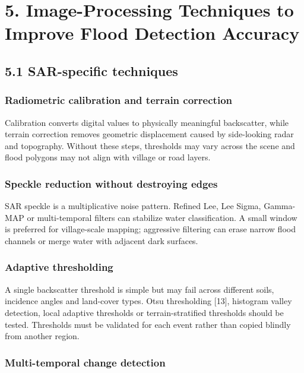 \documentclass[11pt,a4paper]{article}
\begin{document}
\section{5. Image-Processing Techniques to Improve Flood Detection Accuracy}\label{image-processing-techniques-to-improve-flood-detection-accuracy}

\subsection{5.1 SAR-specific techniques}\label{sar-specific-techniques}

\subsubsection{Radiometric calibration and terrain correction}\label{radiometric-calibration-and-terrain-correction}

Calibration converts digital values to physically meaningful backscatter, while terrain correction removes geometric displacement caused by side-looking radar and topography. Without these steps, thresholds may vary across the scene and flood polygons may not align with village or road layers.

\subsubsection{Speckle reduction without destroying edges}\label{speckle-reduction-without-destroying-edges}

SAR speckle is a multiplicative noise pattern. Refined Lee, Lee Sigma, Gamma-MAP or multi-temporal filters can stabilize water classification. A small window is preferred for village-scale mapping; aggressive filtering can erase narrow flood channels or merge water with adjacent dark surfaces.

\subsubsection{Adaptive thresholding}\label{adaptive-thresholding}

A single backscatter threshold is simple but may fail across different soils, incidence angles and land-cover types. Otsu thresholding {[}13{]}, histogram valley detection, local adaptive thresholds or terrain-stratified thresholds should be tested. Thresholds must be validated for each event rather than copied blindly from another region.

\subsubsection{Multi-temporal change detection}\label{multi-temporal-change-detection}
\end{document}
